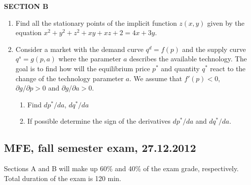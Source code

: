 \documentclass[12pt]{article} %
\theoremstyle{definition} %
\begin{document}
\vspace{20pt}
\textbf{SECTION B}
\vspace{20pt}

\begin{enumerate}[resume]
\item Find all the stationary points of the implicit function $z(x,y)$ given  by the equation $x^2+y^2+z^2+xy+xz+2=4x+3y$.

\item Consider a market with the demand curve $q^d=f(p)$ and the supply curve $q^s=g(p,a)$ where the parameter $a$ describes the available technology. The goal is to find how will the equilibrium price $p^*$ and quantity $q^*$ react to the change of the technology parameter $a$. We assume that  $f'(p)<0$, $\partial g/\partial p>0$ and $\partial g/\partial a>0$.
\begin{enumerate}
\item Find $dp^*/da$, $dq^*/da$
\item If possible determine the sign of the derivatives $dp^*/da$ and $dq^*/da$.
\end{enumerate}

\end{enumerate}


\subsection{MFE, fall semester exam, 27.12.2012}

Sections A and B will make up 60\% and 40\% of the exam grade, respectively. Total duration of the exam is 120 min.
\end{document}

